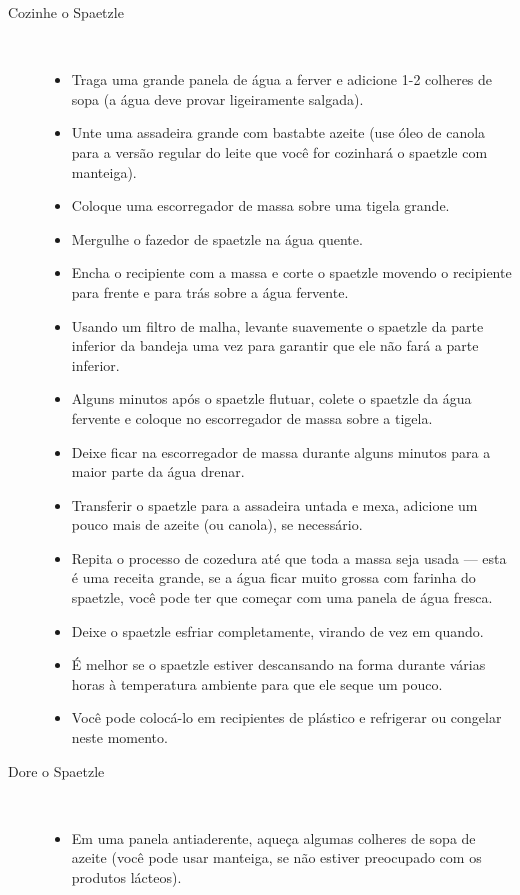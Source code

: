 \documentclass [11pt, letterpaper] {article}
\begin{document}
\begin {description}
\begin {description}
\item [Cozinhe o Spaetzle] \ \\
\begin {itemize}
\item Traga uma grande panela de água a ferver e adicione 1-2 colheres de sopa (a água deve provar ligeiramente salgada).
\item Unte uma assadeira grande com bastabte azeite (use óleo de canola para a versão regular do leite que você for cozinhará o spaetzle com manteiga).
\item Coloque uma escorregador de massa sobre uma tigela grande.
\item Mergulhe o fazedor de spaetzle na água quente.
\item Encha o recipiente com a massa e corte o spaetzle movendo o recipiente para frente e para trás sobre a água fervente.
\item Usando um filtro de malha, levante suavemente o spaetzle da parte inferior da bandeja uma vez para garantir que ele não fará a parte inferior.
\item Alguns minutos após o spaetzle flutuar, colete o spaetzle da água fervente e coloque no escorregador de massa sobre a tigela.
\item Deixe ficar na escorregador de massa durante alguns minutos para a maior parte da água drenar.
\item Transferir o spaetzle para a assadeira untada e mexa, adicione um pouco mais de azeite (ou canola), se necessário.
\item Repita o processo de cozedura até que toda a massa seja usada --- esta é uma receita grande, se a água ficar muito grossa com farinha do spaetzle, você pode ter que começar com uma panela de água fresca.
\item Deixe o spaetzle esfriar completamente, virando de vez em quando.
\item É melhor se o spaetzle estiver descansando na forma durante várias horas à temperatura ambiente para que ele seque um pouco.
\item Você pode colocá-lo em recipientes de plástico e refrigerar ou congelar neste momento.
\end {itemize}
\item [Dore o Spaetzle] \ \\
\begin {itemize}
\item Em uma panela antiaderente, aqueça algumas colheres de sopa de azeite (você pode usar manteiga, se não estiver preocupado com os produtos lácteos).

\end{itemize}
\end{description}
\end{description}
\end{document}
